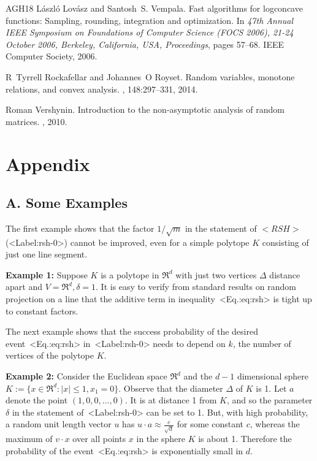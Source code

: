 \documentclass[11pt,letterpaper]{article}
\newcounter{note}[section]
\def\mathsf#1{<#1>}%
\def\xspace{}%
\def\Cref#1{<Label:#1>}%
\def\eqref#1{<Eq.:#1>}%
\theoremstyle{definition}
\theoremstyle{remark}
\newcommand{\dia}{\Delta}
\newcommand{\rsh}{{\mathsf {RSH}}\xspace}
\begin{document}
{\begin{thebibliography}{AGH{\etalchar{+}}18}
L{\'{a}}szl{\'{o}} Lov{\'{a}}sz and Santosh~S. Vempala.
\newblock Fast algorithms for logconcave functions: Sampling, rounding,
  integration and optimization.
\newblock In {\em 47th Annual {IEEE} Symposium on Foundations of Computer
  Science {(FOCS} 2006), 21-24 October 2006, Berkeley, California, USA,
  Proceedings}, pages 57--68. {IEEE} Computer Society, 2006.

R~Tyrrell Rockafellar and Johannes~O Royset.
\newblock Random variables, monotone relations, and convex analysis.
, 148:297--331, 2014.

Roman Vershynin.
\newblock Introduction to the non-asymptotic analysis of random matrices.
, 2010.

\end{thebibliography}
}

\appendix
\section*{Appendix}
\subsection*{{\bf A.} Some Examples}
\label{sec:examples}
The first example shows that the factor $1/\sqrt{m}$ in the statement of $\rsh$ (\Cref{rsh-0}) cannot be improved, even for a simple polytope $K$ consisting of just one line segment. 

\vspace*{0.1 in}
\noindent
{\bf Example 1:} Suppose  $K$  is a polytope in $\Re^d$ with just two vertices $\Delta$ distance apart and $V = \Re^d, \delta=1$. It is easy to verify from standard results on random projection on a line that the additive term in inequality~\eqref{eq:rsh} is tight up to constant factors.

\vspace*{0.1 in}
The next example shows that the success probability of the desired event~\eqref{eq:rsh} in~\Cref{rsh-0} needs to depend on $k$, the number of vertices of the polytope $K$. 

\vspace*{0.1 in}
\noindent
{\bf Example 2:} Consider the Euclidean space $\Re^d$ and the $d-1$ dimensional sphere $K:=\{x \in \Re^d: |x|\leq 1, x_1=0\}$. Observe that the diameter $\dia$ of $K$ is 1. 
Let $a$ denote the point $(1,0,0,\ldots ,0)$. It is at distance 1 from $K$, and so the parameter $\delta$ in the statement of~\Cref{rsh-0} can be set to 1.  But, with high probability,  a random unit length vector $u$ has $u\cdot a\approx \frac{c}{\sqrt d}$ for some constant $c$,  whereas the maximum of  $v\cdot x$ over all points $x$ in the sphere $K$ is about 1. Therefore the probability of the event~\eqref{eq:rsh} is exponentially small in $d$.
\end{document}
